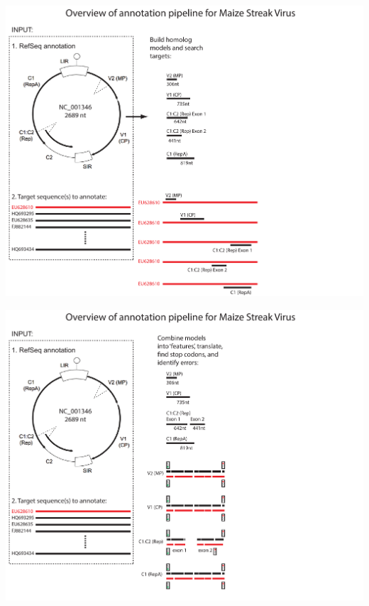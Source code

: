 \documentclass[landscape]{slides}
\begin{document}
\begin{slide}
\includegraphics[width=10in]{figs/annotation-schematic-2}
\vfill
\end{slide}
\begin{slide}
\includegraphics[width=10in]{figs/annotation-schematic-3}
\vfill
\end{slide}
\end{document}

